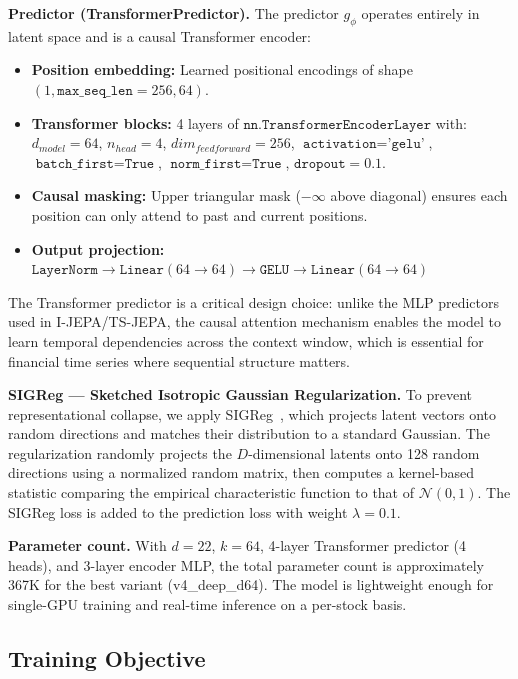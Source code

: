 \documentclass[11pt]{article}
\begin{document}
\textbf{Predictor (TransformerPredictor).}
The predictor $g_\phi$ operates entirely in latent space and is a causal Transformer encoder:

\begin{itemize}[nosep]
  \item \textbf{Position embedding:} Learned positional encodings of shape $(1, \texttt{max\_seq\_len}=256, 64)$.
  \item \textbf{Transformer blocks:} 4 layers of $\texttt{nn.TransformerEncoderLayer}$ with:
    $d_{model}=64$, $n_{head}=4$, $dim_{feedforward}=256$, $\texttt{activation}=\texttt{'gelu'}$, $\texttt{batch\_first}=\texttt{True}$, $\texttt{norm\_first}=\texttt{True}$, $\texttt{dropout}=0.1$.
  \item \textbf{Causal masking:} Upper triangular mask ($-\infty$ above diagonal) ensures each position can only attend to past and current positions.
  \item \textbf{Output projection:} $\texttt{LayerNorm} \to \texttt{Linear}(64\to 64) \to \texttt{GELU} \to \texttt{Linear}(64\to 64)$
\end{itemize}

The Transformer predictor is a critical design choice: unlike the MLP predictors used in I-JEPA/TS-JEPA, the causal attention mechanism enables the model to learn temporal dependencies across the context window, which is essential for financial time series where sequential structure matters.

\textbf{SIGReg --- Sketched Isotropic Gaussian Regularization.}
To prevent representational collapse, we apply SIGReg~\citep{balestriero2025lejepa}, which projects latent vectors onto random directions and matches their distribution to a standard Gaussian. The regularization randomly projects the $D$-dimensional latents onto 128 random directions using a normalized random matrix, then computes a kernel-based statistic comparing the empirical characteristic function to that of $\mathcal{N}(0,1)$. The SIGReg loss is added to the prediction loss with weight $\lambda = 0.1$.

\textbf{Parameter count.}
With $d=22$, $k=64$, 4-layer Transformer predictor (4 heads), and 3-layer encoder MLP, the total parameter count is approximately 367K for the best variant (v4\_deep\_d64). The model is lightweight enough for single-GPU training and real-time inference on a per-stock basis.

\subsection{Training Objective}
\end{document}
